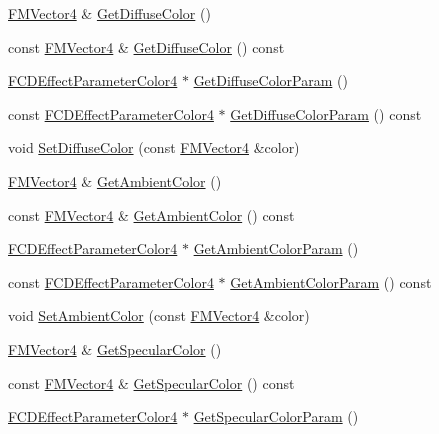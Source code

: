 \begin{DoxyCompactItemize}
\item 
\hyperlink{classFMVector4}{FMVector4} \& \hyperlink{classFCDEffectStandard_a626e44192093159c2e352c8338279815}{GetDiffuseColor} ()
\item 
const \hyperlink{classFMVector4}{FMVector4} \& \hyperlink{classFCDEffectStandard_acc8baa8b4dc83b02d1d532cbb67b9f72}{GetDiffuseColor} () const 
\item 
\hyperlink{classFCDEffectParameterAnimatableT}{FCDEffectParameterColor4} $\ast$ \hyperlink{classFCDEffectStandard_ae93cc60fc1866767d4458fc40ae201d5}{GetDiffuseColorParam} ()
\item 
const \hyperlink{classFCDEffectParameterAnimatableT}{FCDEffectParameterColor4} $\ast$ \hyperlink{classFCDEffectStandard_a0f33f3f13917f86900c05837ed208d3f}{GetDiffuseColorParam} () const 
\item 
void \hyperlink{classFCDEffectStandard_a1382e93839dc984c16d33bfc93572ecd}{SetDiffuseColor} (const \hyperlink{classFMVector4}{FMVector4} \&color)
\item 
\hyperlink{classFMVector4}{FMVector4} \& \hyperlink{classFCDEffectStandard_aa1d50e4a0b7155f4d0c23f15af65fa12}{GetAmbientColor} ()
\item 
const \hyperlink{classFMVector4}{FMVector4} \& \hyperlink{classFCDEffectStandard_a64f7d494685ff88911848a2726f8203d}{GetAmbientColor} () const 
\item 
\hyperlink{classFCDEffectParameterAnimatableT}{FCDEffectParameterColor4} $\ast$ \hyperlink{classFCDEffectStandard_a94ddd58f63bf7a1460cac5048a2cea17}{GetAmbientColorParam} ()
\item 
const \hyperlink{classFCDEffectParameterAnimatableT}{FCDEffectParameterColor4} $\ast$ \hyperlink{classFCDEffectStandard_a5d3405fde172e64f16f53c119d82a49e}{GetAmbientColorParam} () const 
\item 
void \hyperlink{classFCDEffectStandard_a8777730e606304365b9e9db07bb7f145}{SetAmbientColor} (const \hyperlink{classFMVector4}{FMVector4} \&color)
\item 
\hyperlink{classFMVector4}{FMVector4} \& \hyperlink{classFCDEffectStandard_ae457fc42deb3a72cb9b7840364dcebe1}{GetSpecularColor} ()
\item 
const \hyperlink{classFMVector4}{FMVector4} \& \hyperlink{classFCDEffectStandard_af82d5eaf48244a5369ef8ed11213221b}{GetSpecularColor} () const 
\item 
\hyperlink{classFCDEffectParameterAnimatableT}{FCDEffectParameterColor4} $\ast$ \hyperlink{classFCDEffectStandard_a04c6cf85df02970023a6146be45f1e9f}{GetSpecularColorParam} ()

\end{DoxyCompactItemize}
